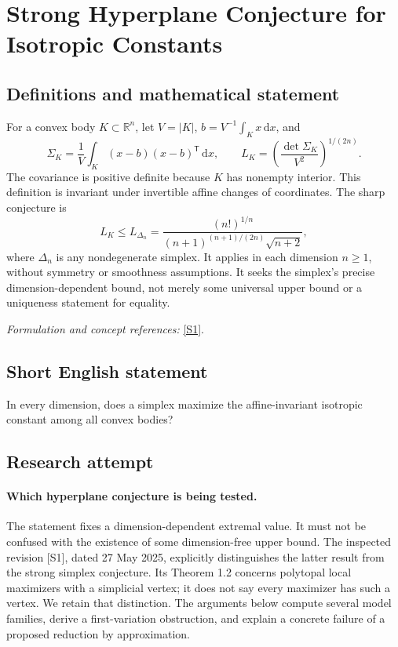 \documentclass[11pt]{article}
\begin{document}
\section*{\texorpdfstring{Strong Hyperplane Conjecture for Isotropic Constants}{Strong Hyperplane Conjecture for Isotropic Constants}}\label{statement}
\subsection{Definitions and mathematical statement}
For a convex body $K\subset{\mathbb{R}}^n$, let $V=|K|$, $b=V^{-1}\int_Kx{\,\mathrm{d}} x$, and
\[
 \Sigma_K=\frac1V\int_K(x-b)(x-b)^{\mathsf T}{\,\mathrm{d}} x,
 \qquad L_K=\left(\frac{\det\Sigma_K}{V^2}\right)^{1/(2n)}.
\]
The covariance is positive definite because $K$ has nonempty interior. This definition is invariant under invertible affine changes of coordinates. The sharp conjecture is
\[
 L_K\le L_{\Delta_n}
 =\frac{(n!)^{1/n}}{(n+1)^{(n+1)/(2n)}\sqrt{n+2}},
\]
where $\Delta_n$ is any nondegenerate simplex. It applies in each dimension $n\ge1$, without symmetry or smoothness assumptions. It seeks the simplex's precise dimension-dependent bound, not merely some universal upper bound or a uniqueness statement for equality.
\par\smallskip\textit{Formulation and concept references:} \href{https://arxiv.org/pdf/2407.01353v2}{[S1]}.

\subsection{Short English statement}
In every dimension, does a simplex maximize the affine-invariant isotropic constant among all convex bodies?
\subsection{Research attempt}
\paragraph{Which hyperplane conjecture is being tested.}
The statement fixes a dimension-dependent extremal value. It must
not be confused with the existence of some dimension-free upper
bound. The inspected revision [S1], dated 27 May 2025, explicitly
distinguishes the latter result from the strong simplex conjecture.
Its Theorem 1.2 concerns polytopal local maximizers with a simplicial
vertex; it does not say every maximizer has such a vertex. We retain
that distinction. The arguments below compute several model families,
derive a first-variation obstruction, and explain a concrete failure
of a proposed reduction by approximation.
\end{document}
